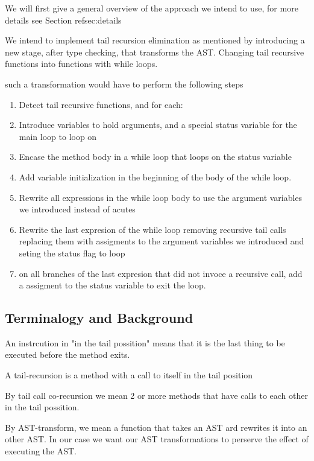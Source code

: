 We will first give a general overview of the approach we intend to use, for more details see Section ref{sec:details}

We intend to implement tail recursion elimination as mentioned by introducing a new stage, after type checking, that transforms the AST. Changing tail recursive functions into functions with while loops.

such a transformation would have to perform the following steps

\begin{enumerate}
    \item Detect tail recursive functions, and for each:
    \item Introduce variables to hold arguments, and a special status variable for the main loop to loop on
    \item Encase the method body in a while loop that loops on the status variable
    \item Add variable initialization in the beginning of the body of the while loop.
    \item Rewrite all expressions in the while loop body to use the argument variables we introduced instead of acutes 
    \item Rewrite the last expresion of the while loop removing recursive tail calls replacing them with assigments to the argument variables we introduced and seting the status flag to loop
    \item on all branches of the last expresion that did not invoce a recursive call, add a assigment to the status variable to exit the loop.
\end{enumerate}




\subsection{Terminalogy and Background}
An instrcution in "in the tail possition" means that it is the last thing to be executed before the method exits.

A tail-recursion is a method with a call to itself in the tail position

By tail call co-recursion we mean 2 or more methods that have calls to each other in the tail possition.


By AST-transform, we mean a function that takes an AST ard rewrites it into an other AST. In our case we want our AST transformations to perserve the effect of executing the AST.


